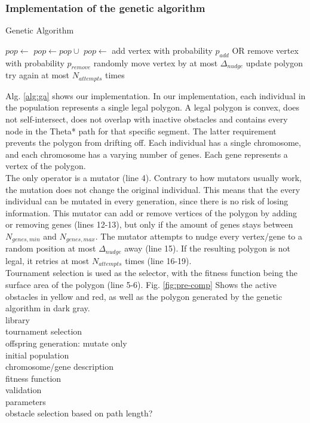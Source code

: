 \subsubsection{Implementation of the genetic algorithm}
\begin{algorithm}
\caption{Genetic Algorithm}
\label{alg:ga}
\begin{algorithmic}[1]
\State $pop \leftarrow $ 
\State $pop \leftarrow pop \cup $ 
\State {}
\State $pop \leftarrow $ 
\EndFor
\Return {}
\EndFunction
{}
\State add vertex with probability $p_{add}$
\State OR remove vertex with probability $p_{remove}$
\State randomly move vertex by at most $\Delta_{nudge}$
\State update polygon
\Else
\State try again at most $N_{attempts}$ times
\EndIf
\EndFor
\EndFor
\Return {}
\EndFunction
\end{algorithmic}
\end{algorithm}

Alg. \ref{alg:ga} shows our implementation. In our implementation, each individual in the population represents a single legal polygon. A legal polygon is convex, does not self-intersect, does not overlap with inactive obstacles and contains every node in the Theta* path for that specific segment. The latter requirement prevents the polygon from drifting off. Each individual has a single chromosome, and each chromosome has a varying number of genes. Each gene represents a vertex of the polygon.\\
The only operator is a mutator (line 4). Contrary to how mutators usually work, the mutation does not change the original individual. This means that the every individual can be mutated in every generation, since there is no risk of losing information. This mutator can add or remove vertices of the polygon by adding or removing genes (lines 12-13), but only if the amount of genes stays between $N_{genes,min}$ and $N_{genes,max}$. The mutator attempts to nudge every vertex/gene to a random position at most $\Delta_{nudge}$ away (line 15). If the resulting polygon is not legal, it retries at most $N_{attempts}$ times (line 16-19). \\
Tournament selection is used as the selector, with the fitness function being the surface area of the polygon (line 5-6). Fig. \ref{fig:pre-comp} Shows the active obstacles in yellow and red, as well as the polygon generated by the genetic algorithm in dark gray.\\


library \\
tournament selection \\
offspring generation: mutate only \\
initial population \\
chromosome/gene description \\
fitness function \\
validation \\
parameters \\
obstacle selection based on path length? \\


